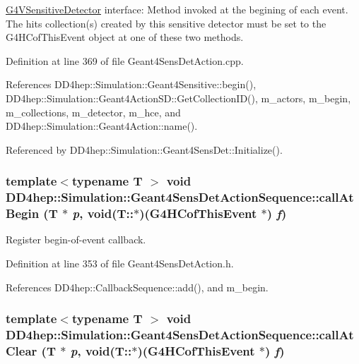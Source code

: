 \hyperlink{class_g4_v_sensitive_detector}{G4VSensitiveDetector} interface: Method invoked at the begining of each event. The hits collection(s) created by this sensitive detector must be set to the G4HCofThisEvent object at one of these two methods. 

Definition at line 369 of file Geant4SensDetAction.cpp.

References DD4hep::Simulation::Geant4Sensitive::begin(), DD4hep::Simulation::Geant4ActionSD::GetCollectionID(), m\_\-actors, m\_\-begin, m\_\-collections, m\_\-detector, m\_\-hce, and DD4hep::Simulation::Geant4Action::name().

Referenced by DD4hep::Simulation::Geant4SensDet::Initialize().\hypertarget{class_d_d4hep_1_1_simulation_1_1_geant4_sens_det_action_sequence_a7905b361bff7168ed4aaf91743f287f2}{
\subsubsection[{callAtBegin}]{\setlength{\rightskip}{0pt plus 5cm}template$<$typename T $>$ void DD4hep::Simulation::Geant4SensDetActionSequence::callAtBegin ({\bf T} $\ast$ {\em p}, \/  void(T::$\ast$)(G4HCofThisEvent $\ast$) {\em f})}}
\label{class_d_d4hep_1_1_simulation_1_1_geant4_sens_det_action_sequence_a7905b361bff7168ed4aaf91743f287f2}


Register begin-\/of-\/event callback. 

Definition at line 353 of file Geant4SensDetAction.h.

References DD4hep::CallbackSequence::add(), and m\_\-begin.\hypertarget{class_d_d4hep_1_1_simulation_1_1_geant4_sens_det_action_sequence_a5c9a64cfbcc0b52ee1c18c0432705bfb}{
\subsubsection[{callAtClear}]{\setlength{\rightskip}{0pt plus 5cm}template$<$typename T $>$ void DD4hep::Simulation::Geant4SensDetActionSequence::callAtClear ({\bf T} $\ast$ {\em p}, \/  void(T::$\ast$)(G4HCofThisEvent $\ast$) {\em f})}}
\label{class_d_d4hep_1_1_simulation_1_1_geant4_sens_det_action_sequence_a5c9a64cfbcc0b52ee1c18c0432705bfb}


